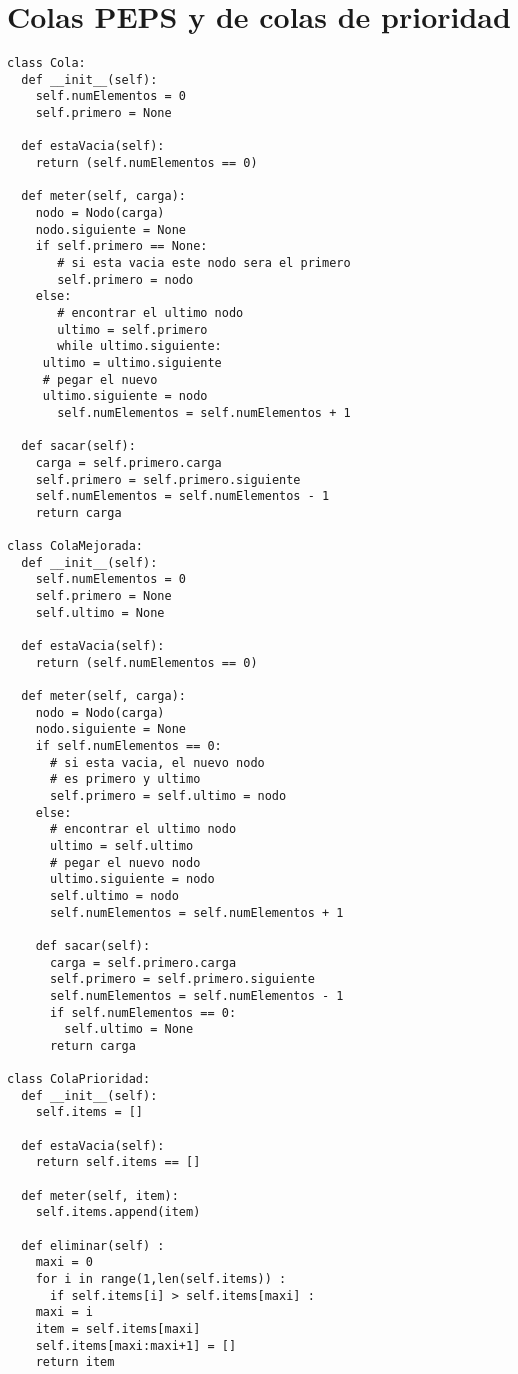\section {Colas PEPS y de colas de prioridad}
\beforeverb
\begin{verbatim}
class Cola:
  def __init__(self):
    self.numElementos = 0
    self.primero = None

  def estaVacia(self):
    return (self.numElementos == 0)

  def meter(self, carga):
    nodo = Nodo(carga) 
    nodo.siguiente = None
    if self.primero == None:
       # si esta vacia este nodo sera el primero
       self.primero = nodo
    else:
       # encontrar el ultimo nodo
       ultimo = self.primero
       while ultimo.siguiente:
	 ultimo = ultimo.siguiente
	 # pegar el nuevo
	 ultimo.siguiente = nodo
       self.numElementos = self.numElementos + 1

  def sacar(self):
    carga = self.primero.carga
    self.primero = self.primero.siguiente
    self.numElementos = self.numElementos - 1
    return carga

class ColaMejorada:
  def __init__(self):
    self.numElementos = 0
    self.primero = None
    self.ultimo = None
        
  def estaVacia(self):
    return (self.numElementos == 0)

  def meter(self, carga):
    nodo = Nodo(carga) 
    nodo.siguiente = None
    if self.numElementos == 0:
      # si esta vacia, el nuevo nodo 
      # es primero y ultimo
      self.primero = self.ultimo = nodo
    else:
      # encontrar el ultimo nodo
      ultimo = self.ultimo
      # pegar el nuevo nodo
      ultimo.siguiente = nodo
      self.ultimo = nodo
      self.numElementos = self.numElementos + 1

    def sacar(self):
      carga = self.primero.carga
      self.primero = self.primero.siguiente
      self.numElementos = self.numElementos - 1
      if self.numElementos == 0:
        self.ultimo = None
      return carga

class ColaPrioridad:
  def __init__(self):
    self.items = []
      
  def estaVacia(self):
    return self.items == []
  
  def meter(self, item):
    self.items.append(item)

  def eliminar(self) :
    maxi = 0
    for i in range(1,len(self.items)) :
      if self.items[i] > self.items[maxi] :
	maxi = i
    item = self.items[maxi]
    self.items[maxi:maxi+1] = []
    return item


\end{verbatim}
